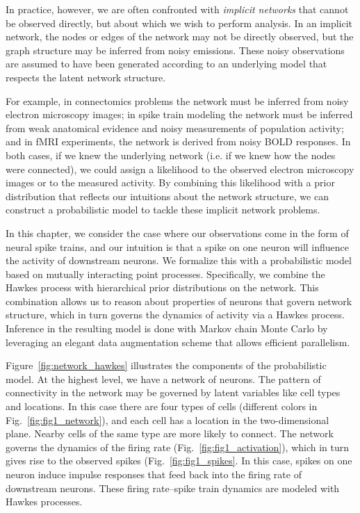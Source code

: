 In practice, however, we are often confronted with \emph{implicit
  networks} that cannot be observed directly, but about which we wish
to perform analysis.  In an implicit network, the nodes or edges of
the network may not be directly observed, but the graph structure may
be inferred from noisy emissions.  These noisy observations are
assumed to have been generated according to an underlying model that
respects the latent network structure.

For example, in connectomics problems the network must be inferred
from noisy electron microscopy images; in spike train modeling the
network must be inferred from weak anatomical evidence and noisy
measurements of population activity; and in fMRI experiments, the
network is derived from noisy BOLD responses.  In both cases, if we
knew the underlying network (i.e.  if we knew how the nodes were
connected), we could assign a likelihood to the observed electron
microscopy images or to the measured activity. By combining this
likelihood with a prior distribution that reflects our intuitions
about the network structure, we can construct a probabilistic model to
tackle these implicit network problems.


In this chapter, we consider the case where our observations come in
the form of neural spike trains, and our intuition is that a spike on
one neuron will influence the activity of downstream neurons.  We formalize
this with a probabilistic model based on mutually interacting point
processes.  Specifically, we combine the Hawkes process
\citep{Hawkes-1971} with hierarchical prior distributions on the network.  This
combination allows us to reason about properties of neurons that govern
network structure, which in turn governs the dynamics of activity via
a Hawkes process. Inference
in the resulting model is done with Markov chain Monte Carlo by leveraging
an elegant data augmentation scheme that allows efficient parallelism.

Figure~\ref{fig:network_hawkes} illustrates the components of the
probabilistic model. At the highest level, we have a network of
neurons.  The pattern of connectivity in the network may be governed
by latent variables like cell types and locations. In this case there
are four types of cells (different colors in
Fig.~\ref{fig:fig1_network}), and each cell has a location in the
two-dimensional plane. Nearby cells of the same type are more likely
to connect. The network governs the dynamics of the firing rate
(Fig.~\ref{fig:fig1_activation}), which in turn gives rise to the
observed spikes (Fig.~\ref{fig:fig1_spikes}. In this case, spikes on
one neuron induce impulse responses that feed back into the firing
rate of downstream neurons. These firing rate--spike train dynamics are 
modeled with Hawkes processes. 

